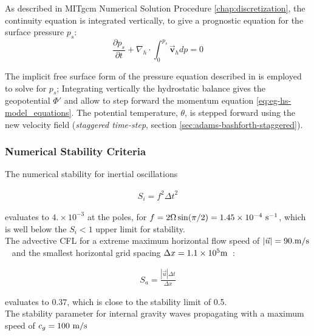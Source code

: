 As described in MITgcm Numerical Solution Procedure \ref{chap:discretization}, 
the continuity equation is integrated vertically, to give a prognostic
equation for the surface pressure $p_s$:
\begin{equation}
\frac{\partial p_s}{\partial t} + \nabla_{h}\cdot \int_{0}^{p_s} \vec{\mathbf{v}}_h dp
= 0
\end{equation}

The implicit free surface form of the pressure equation described in 
\cite{marshall:97a} is employed to solve for $p_s$; 
Integrating vertically the hydrostatic balance 
gives the geopotential $\Phi'$ and allow to step forward the momentum equation
\ref{eq:eg-hs-model_equations}.
The potential temperature, $\theta$, is stepped forward using the 
new velocity field ({\it staggered time-step}, section 
\ref{sec:adams-bashforth-staggered}).
\\

\subsubsection{Numerical Stability Criteria}

\noindent The numerical stability for inertial oscillations
\cite{adcroft:95} 

\begin{eqnarray}
\label{eq:eg-hs-inertial_stability}
S_{i} = f^{2} {\Delta t}^2
\end{eqnarray}

\noindent evaluates to $4.\times10^{-3}$ at the poles, 
for $f=2\Omega\sin(\pi / 2) =1.45\times10^{-4}~{\rm s}^{-1}$, 
which is well below the $S_{i} < 1$ upper limit for stability.
\\

\noindent The advective CFL \cite{adcroft:95} 
for a extreme maximum horizontal flow speed of $ | \vec{u} | = 90. {\rm m/s}$~ 
and the smallest horizontal grid spacing $ \Delta x = 1.1\times10^5 {\rm m}$~:

\begin{eqnarray}
\label{eq:eg-hs-cfl_stability}
S_{a} = \frac{| \vec{u} | \Delta t}{ \Delta x}
\end{eqnarray}

\noindent evaluates to $0.37$, which is close to the stability 
limit of 0.5.
\\

\noindent The stability parameter for internal gravity waves propagating
with a maximum speed of $c_{g}=100~{\rm m/s}$
\cite{adcroft:95}

